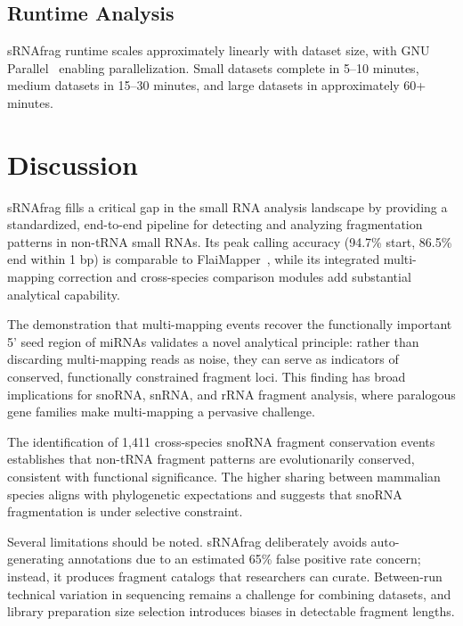 \documentclass[11pt]{article}
\begin{document}
\subsection{Runtime Analysis}

sRNAfrag runtime scales approximately linearly with dataset size, with GNU Parallel~\citep{tange2011parallel} enabling parallelization.  Small datasets complete in 5--10 minutes, medium datasets in 15--30 minutes, and large datasets in approximately 60+ minutes.

\section{Discussion}

sRNAfrag fills a critical gap in the small RNA analysis landscape by providing a standardized, end-to-end pipeline for detecting and analyzing fragmentation patterns in non-tRNA small RNAs.  Its peak calling accuracy (94.7\% start, 86.5\% end within 1 bp) is comparable to FlaiMapper~\citep{hertog2021flaimapper}, while its integrated multi-mapping correction and cross-species comparison modules add substantial analytical capability.

The demonstration that multi-mapping events recover the functionally important 5' seed region of miRNAs validates a novel analytical principle: rather than discarding multi-mapping reads as noise, they can serve as indicators of conserved, functionally constrained fragment loci.  This finding has broad implications for snoRNA, snRNA, and rRNA fragment analysis, where paralogous gene families make multi-mapping a pervasive challenge.

The identification of 1,411 cross-species snoRNA fragment conservation events establishes that non-tRNA fragment patterns are evolutionarily conserved, consistent with functional significance.  The higher sharing between mammalian species aligns with phylogenetic expectations and suggests that snoRNA fragmentation is under selective constraint.

Several limitations should be noted.  sRNAfrag deliberately avoids auto-generating annotations due to an estimated 65\% false positive rate concern; instead, it produces fragment catalogs that researchers can curate.  Between-run technical variation in sequencing remains a challenge for combining datasets, and library preparation size selection introduces biases in detectable fragment lengths.
\end{document}
